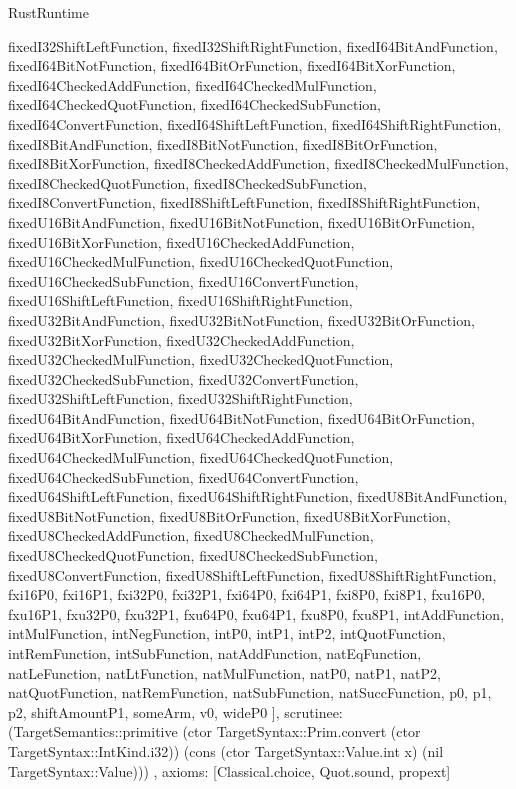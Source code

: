 \begin{lexlean}{RustRuntime}
\begin{semanticmodule}
{{      fixedI32ShiftLeftFunction,
      fixedI32ShiftRightFunction,
      fixedI64BitAndFunction,
      fixedI64BitNotFunction,
      fixedI64BitOrFunction,
      fixedI64BitXorFunction,
      fixedI64CheckedAddFunction,
      fixedI64CheckedMulFunction,
      fixedI64CheckedQuotFunction,
      fixedI64CheckedSubFunction,
      fixedI64ConvertFunction,
      fixedI64ShiftLeftFunction,
      fixedI64ShiftRightFunction,
      fixedI8BitAndFunction,
      fixedI8BitNotFunction,
      fixedI8BitOrFunction,
      fixedI8BitXorFunction,
      fixedI8CheckedAddFunction,
      fixedI8CheckedMulFunction,
      fixedI8CheckedQuotFunction,
      fixedI8CheckedSubFunction,
      fixedI8ConvertFunction,
      fixedI8ShiftLeftFunction,
      fixedI8ShiftRightFunction,
      fixedU16BitAndFunction,
      fixedU16BitNotFunction,
      fixedU16BitOrFunction,
      fixedU16BitXorFunction,
      fixedU16CheckedAddFunction,
      fixedU16CheckedMulFunction,
      fixedU16CheckedQuotFunction,
      fixedU16CheckedSubFunction,
      fixedU16ConvertFunction,
      fixedU16ShiftLeftFunction,
      fixedU16ShiftRightFunction,
      fixedU32BitAndFunction,
      fixedU32BitNotFunction,
      fixedU32BitOrFunction,
      fixedU32BitXorFunction,
      fixedU32CheckedAddFunction,
      fixedU32CheckedMulFunction,
      fixedU32CheckedQuotFunction,
      fixedU32CheckedSubFunction,
      fixedU32ConvertFunction,
      fixedU32ShiftLeftFunction,
      fixedU32ShiftRightFunction,
      fixedU64BitAndFunction,
      fixedU64BitNotFunction,
      fixedU64BitOrFunction,
      fixedU64BitXorFunction,
      fixedU64CheckedAddFunction,
      fixedU64CheckedMulFunction,
      fixedU64CheckedQuotFunction,
      fixedU64CheckedSubFunction,
      fixedU64ConvertFunction,
      fixedU64ShiftLeftFunction,
      fixedU64ShiftRightFunction,
      fixedU8BitAndFunction,
      fixedU8BitNotFunction,
      fixedU8BitOrFunction,
      fixedU8BitXorFunction,
      fixedU8CheckedAddFunction,
      fixedU8CheckedMulFunction,
      fixedU8CheckedQuotFunction,
      fixedU8CheckedSubFunction,
      fixedU8ConvertFunction,
      fixedU8ShiftLeftFunction,
      fixedU8ShiftRightFunction,
      fxi16P0,
      fxi16P1,
      fxi32P0,
      fxi32P1,
      fxi64P0,
      fxi64P1,
      fxi8P0,
      fxi8P1,
      fxu16P0,
      fxu16P1,
      fxu32P0,
      fxu32P1,
      fxu64P0,
      fxu64P1,
      fxu8P0,
      fxu8P1,
      intAddFunction,
      intMulFunction,
      intNegFunction,
      intP0,
      intP1,
      intP2,
      intQuotFunction,
      intRemFunction,
      intSubFunction,
      natAddFunction,
      natEqFunction,
      natLeFunction,
      natLtFunction,
      natMulFunction,
      natP0,
      natP1,
      natP2,
      natQuotFunction,
      natRemFunction,
      natSubFunction,
      natSuccFunction,
      p0,
      p1,
      p2,
      shiftAmountP1,
      someArm,
      v0,
      wideP0
    ],
    scrutinee: (TargetSemantics::primitive (ctor TargetSyntax::Prim.convert (ctor TargetSyntax::IntKind.i32)) (cons (ctor TargetSyntax::Value.int x) (nil TargetSyntax::Value)))
  },
  axioms: [Classical.choice, Quot.sound, propext]
}


\end{semanticmodule}
\end{lexlean}
